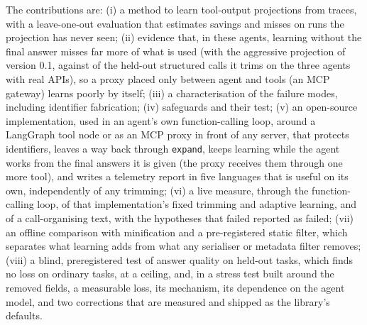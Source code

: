The contributions are: (i) a method to learn tool-output projections from traces, with a leave-one-out evaluation
that estimates savings and misses on runs the projection has never seen; (ii) evidence that, in these agents,
learning without the final answer misses far more of what is used (with the aggressive projection of version 0.1,
\MissesPooledShareRealCalls{} against \MissesPooledShareRealFull{} of the held-out structured calls it trims on the
three agents with real APIs), so a proxy placed only between agent and tools (an MCP gateway) learns poorly by
itself;
(iii) a characterisation of the failure modes, including identifier fabrication; (iv) safeguards and their test;
(v) an open-source implementation, used in an agent's own function-calling loop, around a LangGraph tool node or as an
MCP proxy in front of any server, that protects identifiers, leaves a way back through \texttt{expand}, keeps learning while the agent works
from the final answers it is given (the proxy receives them through one more tool), and writes a telemetry report
in five languages that is useful on its own, independently of any trimming; (vi) a live measure, through the
function-calling loop, of that implementation's fixed trimming and adaptive learning, and of a call-organising
text, with the hypotheses that failed reported as failed; (vii) an offline comparison with minification and a
pre-registered static filter, which separates what learning adds from what any serialiser or metadata filter
removes; (viii) a blind, preregistered test of answer quality on held-out tasks, which finds no loss on ordinary tasks, at
a ceiling, and, in a stress test built around the removed fields, a measurable loss, its mechanism, its dependence on
the agent model, and two corrections that are measured and shipped as the library's defaults.
